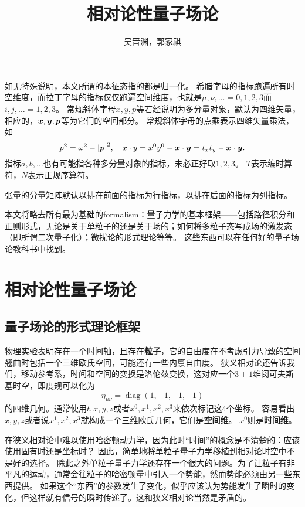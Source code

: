 \documentclass[hyperref, UTF8, a4paper]{ctexbook}
\title{相对论性量子场论}
\author{吴晋渊，郭家祺}
\DeclareMathOperator{\diag}{diag}
\newcommand{\concept}[1]{\underline{\textbf{#1}}}
\begin{document}
\maketitle

\vspace{2em}

如无特殊说明，本文所谓的本征态指的都是归一化。
希腊字母的指标跑遍所有时空维度，而拉丁字母的指标仅仅跑遍空间维度，也就是$\mu, \nu, \ldots = 0, 1, 2, 3$而$i, j, \ldots = 1, 2, 3$。
常规斜体字母$x, y, p$等若经说明为多分量对象，默认为四维矢量，相应的，$\vb*{x}, \vb*{y}, \vb*{p}$等为它们的空间部分。
常规斜体字母的点乘表示四维矢量乘法，如
\[
    p^2 = \omega^2 - \abs{\vb*{p}}^2, \quad x \cdot y = x^0 y^0 - \vb*{x} \cdot \vb*{y} = t_x t_y - \vb*{x} \cdot \vb*{y}.
\]
指标$a,b,\ldots$也有可能指各种多分量对象的指标，未必正好取$1, 2, 3$。
$T$表示编时算符，$N$表示正规序算符。

张量的分量矩阵默认以排在前面的指标为行指标，以排在后面的指标为列指标。

本文将略去所有最为基础的formalism：量子力学的基本框架——包括路径积分和正则形式，无论是关于单粒子的还是关于场的；如何将多粒子态写成场的激发态（即所谓二次量子化）；微扰论的形式理论等等。
这些东西可以在任何好的量子场论教科书中找到。

\part{相对论性量子场论}

\chapter{量子场论的形式理论框架}

物理实验表明存在一个时间轴，且存在\concept{粒子}，它的自由度在不考虑引力导致的空间翘曲时包括一个三维欧氏空间，可能还有一些内禀自由度。
狭义相对论还告诉我们，移动参考系，时间和空间的变换是洛伦兹变换，这对应一个$3+1$维闵可夫斯基时空，即度规可以化为
\[
    \eta_{\mu\nu} = \diag (1, -1, -1, -1)
\]
的四维几何。通常使用$t, x, y, z$或者$x^0, x^1, x^2, x^3$来依次标记这4个坐标。
容易看出$x, y, z$或者说$x^1, x^2, x^3$就构成一个三维欧氏几何，它们是\concept{空间维}。%
$x^0$则是\concept{时间维}。

在狭义相对论中难以使用哈密顿动力学，因为此时“时间”的概念是不清楚的：应该使用固有时还是坐标时？
因此，简单地将单粒子量子力学移植到相对论时空中不是好的选择。
除此之外单粒子量子力学还存在一个很大的问题。为了让粒子有非平凡的运动，通常会往粒子的哈密顿量中引入一个势能，然而势能必须由另一些东西提供。
如果这个“东西”的参数发生了变化，似乎应该认为势能发生了瞬时的变化，但这样就有信号的瞬时传递了。这和狭义相对论当然是矛盾的。
\end{document}
